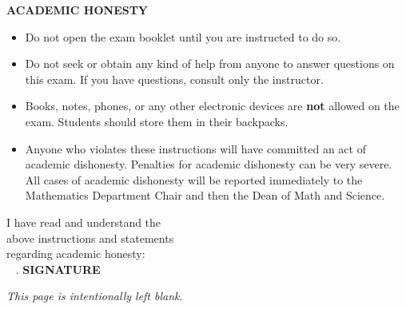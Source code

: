 \documentclass[addpoints,12pt,answers]{exam}
\begin{document}
\textbf{ACADEMIC HONESTY}\\[8pt]
\phantom{.}\hspace{.7cm}
\begin{minipage}{6.3in}
	\begin{itemize}
		
		\item Do not open the exam booklet until you are instructed to do so.
		\item Do not seek or obtain any kind of help from anyone to answer questions on this exam. If you have questions, consult only the instructor.
		\item Books, notes, phones, or any other electronic devices are \textbf{not} allowed on the exam. Students should store them in their backpacks.
		\item Anyone who violates these instructions will have committed an act of academic dishonesty.
		Penalties for academic dishonesty can be very severe. All cases of academic dishonesty will be reported immediately to the Mathematics Department Chair and then the Dean of Math and Science.
	\end{itemize}
\end{minipage}

\vspace{1cm}

\noindent I have read and understand the\\ above instructions and statements\\ regarding academic honesty:  \, \, \hrulefill\\
\ {\color{white} .} \hspace{11 cm} \textbf{{\footnotesize SIGNATURE}}


\vfill

\newpage
\phantom{.}
\vfill
\begin{center}
   \textit{This page is intentionally left blank}.
\end{center}
\vfill

\newpage


\end{document}
